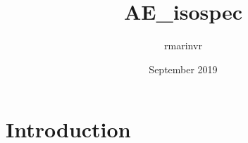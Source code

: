 \documentclass{article}
\title{AE\_isospec}
\author{rmarinvr }
\date{September 2019}
\begin{document}
\maketitle

\section{Introduction}
\end{document}
